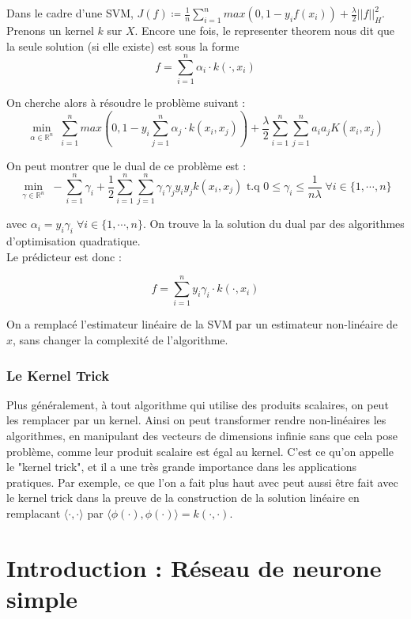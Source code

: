 \documentclass[a4paper, 11pt, french]{article}
\theoremstyle{definition}
\begin{document}
	Dans le cadre d'une SVM, $J(f) \coloneqq \frac{1}{n} \sum_{i=1}^{n} max(0, 1 - y_i f(x_i)) + \frac{\lambda}{2} ||f||_H^2$. Prenons un kernel $k$ sur $X$. Encore une fois, le representer theorem nous dit que la seule solution (si elle existe) est sous la forme
	\[f = \sum_{i=1}^{n} \alpha_i \cdot k(\cdot, x_i)\]
	
	On cherche alors à résoudre le problème suivant :
	\[\min_{\alpha \in \mathbb{R}^n} \; \sum_{i=1}^{n} max(0, 1 - y_i \sum_{j=1}^{n} \alpha_j \cdot k(x_i, x_j))  + \frac{\lambda}{2} \sum_{i=1}^{n} \sum_{j=1}^{n} a_i a_j K(x_i, x_j)\]
	
	 On peut montrer que le dual de ce problème est :
	\[\min_{\gamma \in \mathbb{R}^n} \; -\sum_{i=1}^{n} \gamma_i + \frac{1}{2} \sum_{i=1}^{n} \sum_{j=1}^{n} \gamma_i \gamma_j y_i y_j k(x_i, x_j) \text{ t.q } 0 \leq \gamma_i \leq \frac{1}{n \lambda} \; \forall i \in \{1, \cdots, n\}\]
	
	avec $\alpha_i = y_i \gamma_i \; \forall i \in \{1, \cdots, n\}$. On trouve la la solution du dual par des algorithmes d'optimisation quadratique. \\
	
	Le prédicteur est donc :
	
	\[f = \sum_{i=1}^{n} y_i \gamma_i \cdot k(\cdot, x_i)\]
	
	On a remplacé l'estimateur linéaire de la SVM par un estimateur non-linéaire de $x$, sans changer la complexité de l'algorithme.
	
	\subsubsection{Le Kernel Trick}
	
	Plus généralement, à tout algorithme qui utilise des produits scalaires, on peut les remplacer par un kernel. Ainsi on peut transformer rendre non-linéaires les algorithmes, en manipulant des vecteurs de dimensions infinie sans que cela pose problème, comme leur produit scalaire est égal au kernel. C'est ce qu'on appelle le "kernel trick", et il a une très grande importance dans les applications pratiques. Par exemple, ce que l'on a fait plus haut avec peut aussi être fait avec le kernel trick dans la preuve de la construction de la solution linéaire en remplacant $\langle \cdot, \cdot \rangle$ par $\langle \phi(\cdot), \phi(\cdot) \rangle = k(\cdot, \cdot)$.
	
	
	
	\section{Introduction : Réseau de neurone simple}
	
\end{document}
